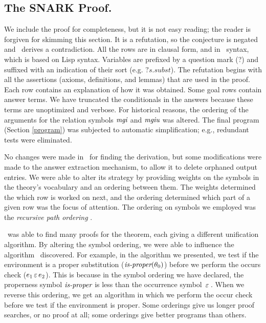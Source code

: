 \documentclass[runningheads]{llncs}
\DeclareMathOperator{\mgi}{\emph{mgi}}
\DeclareMathOperator{\mgiu}{\emph{mgiu}}
\begin{document}
\subsection{The SNARK Proof.} 
\label{proof}
We include the proof for completeness, but it is not easy reading; the reader is forgiven for skimming this section.   It is a refutation, so the conjecture is negated and \SNARK\ derives a contradiction.  All the rows are in clausal form, and in \SNARK\ syntax, which is based on Lisp syntax.  Variables are prefixed by a question mark (?) and suffixed with an indication of their sort (e.g. $?s.subst$).  The refutation begins with all the assertions (axioms, definitions, and lemmas) that are used in the proof.  Each row contains an explanation of how it was obtained.  Some goal rows contain answer terms.  We have truncated the conditionals in the answers because these terms are unoptimized and verbose. For historical reasons, the ordering of the arguments for the relation symbols $\mgi$ and $\mgiu$ was altered.  The final program (Section \ref{program}) was subjected to automatic simplification; e.g., redundant tests were eliminated.

No changes were made in \SNARK\ for finding the derivation, but some modifications were made to the answer extraction mechanism, to allow it to delete orphaned output entries. We were able to alter its strategy by providing weights on the symbols in the theory's vocabulary and an ordering between them.  The weights determined the which row is worked on next, and the ordering determined which part of a given row was the focus of attention. The ordering on symbols we employed was the \emph{recursive path ordering} \citep{dersh}. 

 \SNARK\ was able to find many proofs for the theorem, each giving a different unification algorithm. By altering the symbol ordering, we were able to influence the algorithm \SNARK\ discovered.  For example, in the algorithm we presented, we test if the environment is a proper substitution ($\emph{is-proper}(\theta_{0})$) before we perform the occurs check ($e_{1} \, \varepsilon \, e_{2}$). This is because in the symbol ordering we have declared, the properness symbol $\emph{is-proper}$ is less than the occurrence symbol $\, \varepsilon \,$.  When we reverse this ordering, we get an algorithm in which we perform the occur check before we test if the environment is proper. Some orderings give us longer proof searches, or no proof at all; some orderings give better programs than others.
\end{document}
